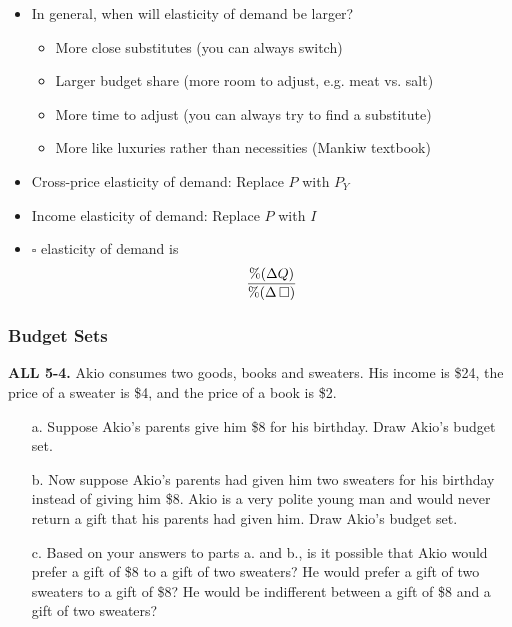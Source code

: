 \documentclass[12pt, xcolor=dvipsnames]{beamer}
\begin{document}
\begin{frame}
\begin{itemize}
	\item In general, when will elasticity of demand be larger?
	\begin{itemize}
		\item More close substitutes (you can always switch)
		\item Larger budget share (more room to adjust, e.g. meat vs. salt)
		\item More time to adjust (you can always try to find a substitute)
		\item More like luxuries rather than necessities (Mankiw textbook)
	\end{itemize}
	\item Cross-price elasticity of demand: Replace $P$ with $P_Y$
	\item Income elasticity of demand: Replace $P$ with $I$
	\item $\square$ elasticity of demand is 
	\[{\%(\Delta Q)\over \%(\Delta\,\square)}\]
\end{itemize}
\end{frame}



\begin{frame}
\frametitle{\bf Budget Sets}
\small \textsf{\bfseries ALL 5-4.} 
Akio consumes two goods, books and sweaters. His income is \$24, the price of a sweater is \$4, and the price of a book is \$2.
\begin{enumerate}\itemsep-0.5ex
\item[a.] Suppose Akio’s parents give him \$8 for his birthday. Draw Akio’s budget set.
\item[b.] Now suppose Akio’s parents had given him two sweaters for his birthday instead of giving him \$8. Akio is a very polite young man and would never return a gift that his parents had given him. Draw Akio’s budget set.
\item[c.] Based on your answers to parts a. and b., is it possible that Akio would prefer a gift of \$8 to a gift of two sweaters? He would prefer a gift of two sweaters to a gift of \$8? He would be indifferent between a gift of \$8 and a gift of two sweaters?
\end{enumerate}
\end{frame}
\end{document}
